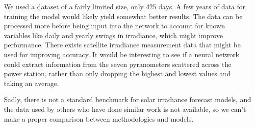 We used a dataset of a fairly limited size, only 425 days. A few years of data for training the model would likely yield somewhat better results. The data can be processed more before being input into the network to account for known variables like daily and yearly swings in irradiance, which might improve performance. There exists satellite irradiance measurement data that might be used for improving accuracy. It would be interesting to see if a neural network could extract information from the seven pyranometers scattered across the power station, rather than only dropping the highest and lowest values and taking an average. 

Sadly, there is not a standard benchmark for solar irradiance forecast models, and the data used by others who have done similar work is not available, so we can't make a proper comparison between methodologies and models. 
